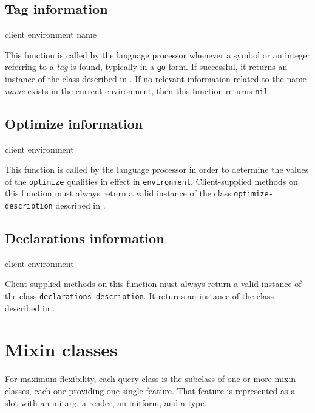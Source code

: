 \subsection{Tag information}

{\footnotesize
{} {client environment name}
}

This function is called by the language processor whenever a symbol or
an integer referring to a \emph{tag} is found, typically in a
\texttt{go} form.  If successful, it returns an instance of the class
described in .  If no
relevant information related to the name \textit{name} exists in the
current environment, then this function returns \texttt{nil}.

\subsection{Optimize information}

{\footnotesize
{} {client environment}
}

This function is called by the language processor in order to
determine the values of the \texttt{optimize} qualities in effect in
\texttt{environment}.  Client-supplied methods on this function must
always return a valid instance of the class
\texttt{optimize-description} described in
.


\subsection{Declarations information}

{\footnotesize
{} {client environment}
}

Client-supplied methods on this function must always return a valid
instance of the class \texttt{declarations-description}.  It returns
an instance of the class described in
.


\section{Mixin classes}

For maximum flexibility, each query class is the subclass of one or
more mixin classes, each one providing one single feature.  That
feature is represented as a slot with an initarg, a reader, an
initform, and a type.


